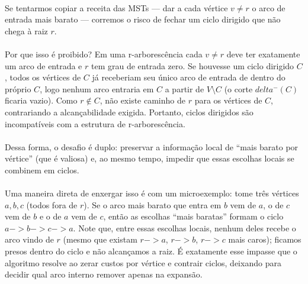 \documentclass[12pt,a4paper]{article}
\def\emph#1{#1}%
\def\to{->}%
\def\delta{delta}%
\begin{document}
\paragraph{}
Se tentarmos copiar a receita das MSTs — dar a cada vértice \(v\neq r\) o arco de entrada mais barato — corremos o risco de fechar um \emph{ciclo dirigido} que não chega à raiz \(r\).

\paragraph{}
Por que isso é proibido? Em uma r-arborescência cada \(v\neq r\) deve ter exatamente um arco de entrada e \(r\) tem grau de entrada zero. Se houvesse um ciclo dirigido \(C\), todos os vértices de \(C\) já receberiam seu único arco de entrada de dentro do próprio \(C\), logo nenhum arco entraria em \(C\) a partir de \(V\setminus C\) (o corte \(\delta^-(C)\) ficaria vazio). Como \(r\notin C\), não existe caminho de \(r\) para os vértices de \(C\), contrariando a alcançabilidade exigida. Portanto, ciclos dirigidos são incompatíveis com a estrutura de r-arborescência.

\paragraph{}
Dessa forma, o desafio é duplo: preservar a informação local de “mais barato por vértice” (que é valiosa) e, ao mesmo tempo, impedir que essas escolhas locais se combinem em ciclos.

\paragraph{}
Uma maneira direta de enxergar isso é com um microexemplo: tome três vértices \(a,b,c\) (todos fora de \(r\)). Se o arco mais barato que entra em \(b\) vem de \(a\), o de \(c\) vem de \(b\) e o de \(a\) vem de \(c\), então as escolhas “mais baratas” formam o ciclo \(a\to b\to c\to a\). Note que, entre essas escolhas locais, nenhum deles recebe o arco vindo de \(r\) (mesmo que existam \(r\to a\), \(r\to b\), \(r\to c\) mais caros); ficamos presos dentro do ciclo e não alcançamos a raiz. É exatamente esse impasse que o algoritmo resolve ao zerar custos por vértice e contrair ciclos, deixando para decidir qual arco interno remover apenas na expansão.
\end{document}
